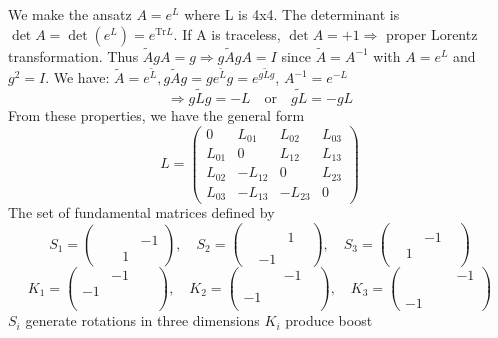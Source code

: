 \documentclass{article}
\begin{document}
	We make the ansatz $A = e^L$ where L is 4x4. The determinant is $\det A = \det(e^L) = e^{\text{Tr}L}$.
	If A is traceless, $\det A = +1 \Rightarrow$ proper Lorentz transformation.
	Thus $\tilde{A} g A = g \Rightarrow g\tilde{A}g A = I$ since $\tilde{A}=A^{-1}$ with $A = e^L$ and $g^2 = I$.
	We have: $\tilde{A} = e^{\tilde{L}}, g \tilde{A} g = g e^{\tilde{L}} g = e^{g \tilde{L} g}$, $A^{-1} = e^{-L}$
	\[
	\Rightarrow g\tilde{L}g = -L \quad \text{or} \quad \tilde{gL} = -gL
	\]
	From these properties, we have the general form
	\[
	L = \begin{pmatrix} 0 & L_{01} & L_{02} & L_{03} \\ L_{01} & 0 & L_{12} & L_{13} \\ L_{02} & -L_{12} & 0 & L_{23} \\ L_{03} & -L_{13} & -L_{23} & 0 \end{pmatrix}
	\]
	The set of fundamental matrices defined by
	\[
	S_1 = \begin{pmatrix} & & & \\ & & & -1 \\ & & 1 & \end{pmatrix}, \quad
	S_2 = \begin{pmatrix} & & & \\ & & 1 & \\ & & & \\ & -1 & & \end{pmatrix}, \quad
	S_3 = \begin{pmatrix} & & & \\ & & -1 & \\ & 1 & & \\ & & & \end{pmatrix}
	\]
	\[
	K_1 = \begin{pmatrix} & -1 & & \\ -1 & & & \\ & & & \\ & & & \end{pmatrix}, \quad
	K_2 = \begin{pmatrix} & & -1 & \\ & & & \\ -1 & & & \\ & & & \end{pmatrix}, \quad
	K_3 = \begin{pmatrix} & & & -1 \\ & & & \\ & & & \\ -1 & & & \end{pmatrix}
	\]
	$S_i$ generate rotations in three dimensions
	$K_i$ produce boost
	
\end{document}
